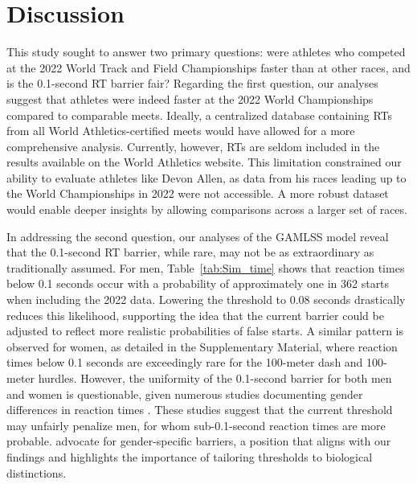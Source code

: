 \documentclass[12pt, letterpaper]{article}
\begin{document}
\section{Discussion}\label{sec:concludingremarks}


This study sought to answer two primary questions: were athletes who
competed at the 2022 World Track and Field Championships faster than
at other races, and is the 0.1-second RT barrier fair?
Regarding the first question, our analyses suggest that athletes were
indeed faster at the 2022 World Championships compared to comparable
meets. Ideally, a centralized database containing RTs from
all World Athletics-certified meets would have allowed for a more
comprehensive analysis. Currently, however, RTs are seldom
included in the results available on the World Athletics website. This
limitation constrained our ability to evaluate athletes like Devon
Allen, as data from his races leading up to the World Championships in
2022 were not accessible. A more robust dataset would enable deeper
insights by allowing comparisons across a larger set of races.


In addressing the second question, our analyses of the GAMLSS model
reveal that the 0.1-second RT barrier, while rare, may not
be as extraordinary  as traditionally assumed. For men,
Table~\ref{tab:Sim_time} shows that reaction  times below 0.1 seconds
occur with a probability of approximately one in 362 starts  when
including the 2022 data. Lowering the threshold to 0.08 seconds
drastically  reduces this likelihood, supporting the idea that the
current barrier could be adjusted to reflect more realistic
probabilities of false starts. A similar pattern is observed for
women, as detailed in the Supplementary Material, where reaction
times below 0.1 seconds are exceedingly rare for the 100-meter dash
and 100-meter  hurdles. However, the uniformity of the 0.1-second
barrier for both men and women  is questionable, given numerous
studies documenting gender differences in reaction  times
\citep[e.g.,][]{lipps2011implications, babicc2009reaction,
  panoutsakopoulos2020gender}. These studies suggest that the current
threshold may  unfairly penalize men, for whom sub-0.1-second reaction
times are more probable. \citet{brosnan2017effects} advocate for
gender-specific barriers, a position that  aligns with our findings
and highlights the importance of tailoring thresholds to  biological
distinctions.
\end{document}
